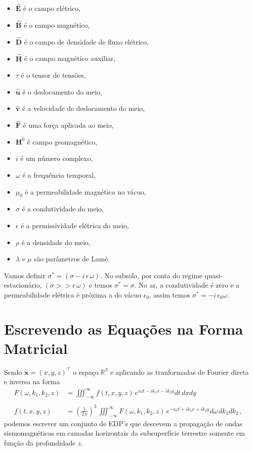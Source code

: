 \begin{itemize}
\item $\mathbf{\widehat{E}}$ \'e o campo el\'etrico,
\item $\mathbf{\widehat{B}}$ \'e o campo magn\'etico,
\item $\mathbf{\widehat{D}}$ \'e o campo de densidade de fluxo el\'etrico,
\item $\mathbf{\widehat{H}}$ \'e o campo magn\'etico auxiliar,
\item $\tau$ \'e o tensor de tens\~oes,
\item $\mathbf{\widehat{u}}$ \'e o deslocamento do meio,
\item $\mathbf{\widehat{v}}$ \'e a velocidade de deslocamento do meio,
\item $\mathbf{\widehat{F}}$ \'e uma for\c{c}a aplicada ao meio,
\item $\mathbf{H}^0$ \'e campo geomagn\'etico,
\item $i$ \'e um n\'umero complexo,
\item $\omega$ \'e a frequ\^encia temporal,
\item $\mu_0$ \'e a permeabilidade magn\'etica no v\'acuo,
\item $\sigma$ \'e a condutividade do meio,
\item $\epsilon$ \'e a permissividade el\'etrica do meio,
\item $\rho$ \'e a densidade do meio,
\item $\lambda$ e $\mu$ s\~ao par\^ametros de Lam\`e.
\end{itemize}
Vamos definir $\sigma^*=(\sigma-i\,\epsilon\,\omega)$. No subsolo, por conta do regime quasi-estacion\'ario, $(\sigma>>\epsilon\,\omega)$  e  temos $\sigma^*=\sigma$. No ar, a condutividade \'e zero e a permeabilidade el\'etrica \'e pr\'oxima a do v\'acuo $\epsilon_0$, assim temos $\sigma^*=-i\,\epsilon_0\omega$.

\section{Escrevendo as Equa\c{c}\~oes na Forma Matricial}

Sendo $\mathbf{x}=(x,y,z)^{\top}$ o espa\c{c}o $\mathbb{R}^3$ e aplicando as tranformadas de Fourier direta e inversa na forma
\begin{align*}
F(\omega,k_1,k_2,z) &= \iiint_{-\infty}^{\infty}f(t,x,y,z)\,e^{i\omega t-ik_1x-ik_2y}dt\,dxdy\\\\
f(t,x,y,z) &= \left(\frac{1}{2\,\pi}\right)^3\,\iiint_{-\infty}^{\infty}F(\omega,k_1,k_2,z)\,e^{-i\omega t+ik_1x+ik_2y}d\omega\,dk_1dk_2\,,
\end{align*}
podemos escrever um conjunto de EDP's que descevem a propaga\c{c}\~ao de ondas sismomagn\'eticas em camadas horizontais da subsuperf\'icie terrestre somente em fun\c{c}\~ao da profundidade $z$. 

